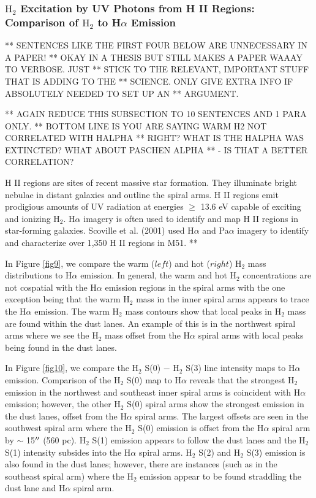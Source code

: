 \documentclass[manuscript]{aastex}
\begin{document}
\subsubsection{$\mathrm{H_2}$ Excitation by UV Photons from H II Regions: Comparison of $\mathrm{H_2}$ to H$\alpha$ Emission}

** SENTENCES LIKE THE FIRST FOUR BELOW ARE UNNECESSARY IN A PAPER!
** OKAY IN A THESIS BUT STILL MAKES A PAPER WAAAY TO VERBOSE.  JUST
** STICK TO THE RELEVANT, IMPORTANT STUFF THAT IS ADDING TO THE
** SCIENCE.  ONLY GIVE EXTRA INFO IF ABSOLUTELY NEEDED TO SET UP AN
** ARGUMENT.

** AGAIN REDUCE THIS SUBSECTION TO 10 SENTENCES AND 1 PARA ONLY.
** BOTTOM LINE IS YOU ARE SAYING WARM H2 NOT CORRELATED WITH HALPHA
** RIGHT?  WHAT IS THE HALPHA WAS EXTINCTED?  WHAT ABOUT PASCHEN ALPHA
** - IS THAT A BETTER CORRELATION?

H II regions are
sites of recent massive star formation.  
They illuminate bright nebulae in distant galaxies and outline the
spiral arms.  H II regions emit prodigious amounts of UV radiation at
energies $\ge$ 13.6 eV capable of exciting and ionizing
$\mathrm{H_2}$.  H$\alpha$ imagery is often used to identify and map H
II regions in star-forming galaxies.  Scoville et al. (2001) used
H$\alpha$ and Pa$\alpha$ imagery to identify and characterize over
1,350 H II regions in M51. ** 

In Figure \ref{fig9}, we compare the warm ($left$) and hot ($right$)
$\mathrm{H_2}$ mass distributions to H$\alpha$ emission.  In general,
the warm and hot $\mathrm{H_2}$ concentrations are not cospatial with
the H$\alpha$ emission regions in the spiral arms with the one
exception being that the warm $\mathrm{H_2}$ mass in the inner spiral
arms appears to trace the H$\alpha$ emission.  The warm $\mathrm{H_2}$
mass contours show that local peaks in $\mathrm{H_2}$ mass are found
within the dust lanes.  An example of this is in the northwest spiral
arms where we see the $\mathrm{H_2}$ mass offset from the H$\alpha$
spiral arms with local peaks being found in the dust lanes.

In Figure \ref{fig10}, we compare the $\mathrm{H_2}$ S(0) $-$
$\mathrm{H_2}$ S(3) line intensity maps to H$\alpha$ emission.
Comparison of the $\mathrm{H_2}$ S(0) map to H$\alpha$ reveals that
the strongest $\mathrm{H_2}$ emission in the northwest and southeast
inner spiral arms is coincident with H$\alpha$ emission; however, the
other $\mathrm{H_2}$ S(0) spiral arms show the strongest emission in
the dust lanes, offset from the H$\alpha$ spiral arms.  The largest
offsets are seen in the southwest spiral arm where the $\mathrm{H_2}$
S(0) emission is offset from the H$\alpha$ spiral arm by $\sim$
15$\mbox{$^{\prime\prime}$}$ (560 pc).  $\mathrm{H_2}$ S(1) emission appears to follow
the dust lanes and the $\mathrm{H_2}$ S(1) intensity subsides into the
H$\alpha$ spiral arms.  $\mathrm{H_2}$ S(2) and $\mathrm{H_2}$ S(3)
emission is also found in the dust lanes; however, there are instances
(such as in the southeast spiral arm) where the $\mathrm{H_2}$
emission appear to be found straddling the dust lane and H$\alpha$
spiral arm.
\end{document}

